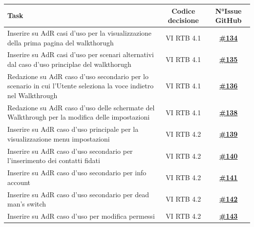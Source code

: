 \documentclass[a4paper,12pt]{article}
\newcommand{\ignoreglossary}{}
\begin{document}
\begin{center}
\small
\renewcommand{\arraystretch}{1.2} 
\begin{longtable}{|p{}|c|c|}
\hline
\rowcolor{gray!60} 
\textbf{Task} & \textbf{Codice decisione} & \textbf{N°Issue GitHub} \\
\hline
\rowcolor{white}
Inserire su AdR casi d'uso per la visualizzazione della prima pagina del walkthorugh & VI \ignoreglossary{RTB} 4.1 & \href{https://github.com/SWE-BitByBit/SWE-docs/issues/134}{\textbf{\#134}} \\
\hline
\rowcolor{gray!20}
Inserire su AdR casi d'uso per scenari alternativi dal caso d'uso principlae del walkthorugh & VI \ignoreglossary{RTB} 4.1 & \href{https://github.com/SWE-BitByBit/SWE-docs/issues/135}{\textbf{\#135}} \\
\hline
\rowcolor{white}
Redazione su AdR caso d'uso secondario per lo scenario in cui l'Utente seleziona la voce indietro nel Walkthrough & VI \ignoreglossary{RTB} 4.1 & \href{https://github.com/SWE-BitByBit/SWE-docs/issues/136}{\textbf{\#136}} \\
\hline
\rowcolor{gray!20}
Redazione su AdR caso d'uso delle schermate del Walkthrough per la modifica delle impostazioni & VI \ignoreglossary{RTB} 4.1 & \href{https://github.com/SWE-BitByBit/SWE-docs/issues/138}{\textbf{\#138}} \\
\hline
\rowcolor{white}
Inserire su AdR caso d'uso principale per la visualizzazione menu impostazioni & VI \ignoreglossary{RTB} 4.2 & \href{https://github.com/SWE-BitByBit/SWE-docs/issues/139}{\textbf{\#139}} \\
\hline
\rowcolor{gray!20}
Inserire su AdR caso d'uso secondario per l'inserimento dei contatti fidati & VI \ignoreglossary{RTB} 4.2 & \href{https://github.com/SWE-BitByBit/SWE-docs/issues/140}{\textbf{\#140}} \\
\hline
\rowcolor{white}
Inserire su AdR caso d'uso secondario per info account & VI \ignoreglossary{RTB} 4.2 & \href{https://github.com/SWE-BitByBit/SWE-docs/issues/141}{\textbf{\#141}} \\
\hline
\rowcolor{gray!20}
Inserire su AdR caso d'uso secondario per dead man's switch & VI \ignoreglossary{RTB} 4.2 & \href{https://github.com/SWE-BitByBit/SWE-docs/issues/142}{\textbf{\#142}} \\
\hline
\rowcolor{white}
Inserire su AdR caso d'uso per modifica permessi & VI \ignoreglossary{RTB} 4.2 & \href{https://github.com/SWE-BitByBit/SWE-docs/issues/143}{\textbf{\#143}} \\

\end{longtable}
\end{center}
\end{document}
